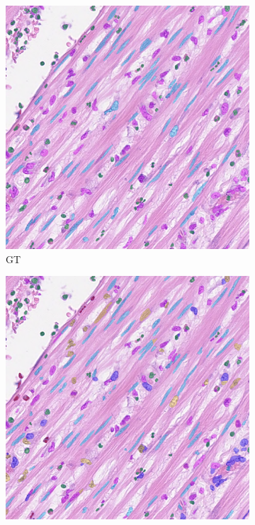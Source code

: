 \begin{figure}[H]
    \centering
    \begin{subfigure}[b]{0.3\textwidth}
    \includegraphics[width=\textwidth]{imgs/qual/consep/gt3.overlay.png}
    \caption{GT}
  \end{subfigure}
  \begin{subfigure}[b]{0.3\textwidth}
    \includegraphics[width=\textwidth]{imgs/qual/consep/hov3.png}

\end{subfigure}
\end{figure}

